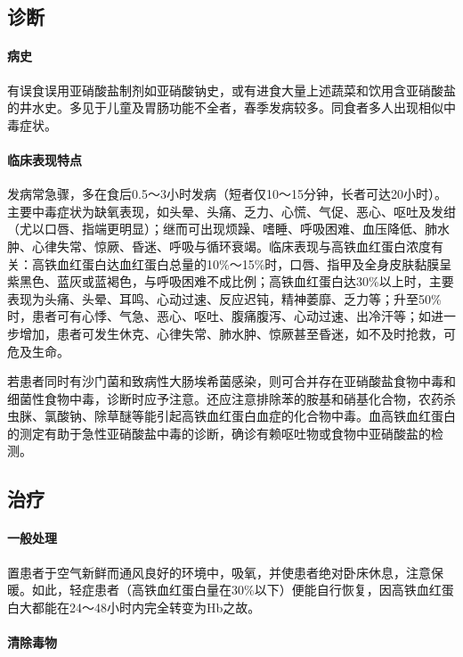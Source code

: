 \subsection{诊断}

\paragraph{病史}

有误食误用亚硝酸盐制剂如亚硝酸钠史，或有进食大量上述蔬菜和饮用含亚硝酸盐的井水史。多见于儿童及胃肠功能不全者，春季发病较多。同食者多人出现相似中毒症状。

\paragraph{临床表现特点}

发病常急骤，多在食后0.5～3小时发病（短者仅10～15分钟，长者可达20小时）。主要中毒症状为缺氧表现，如头晕、头痛、乏力、心慌、气促、恶心、呕吐及发绀（尤以口唇、指端更明显）；继而可出现烦躁、嗜睡、呼吸困难、血压降低、肺水肿、心律失常、惊厥、昏迷、呼吸与循环衰竭。临床表现与高铁血红蛋白浓度有关：高铁血红蛋白达血红蛋白总量的10\%～15\%时，口唇、指甲及全身皮肤黏膜呈紫黑色、蓝灰或蓝褐色，与呼吸困难不成比例；高铁血红蛋白达30\%以上时，主要表现为头痛、头晕、耳鸣、心动过速、反应迟钝，精神萎靡、乏力等；升至50\%时，患者可有心悸、气急、恶心、呕吐、腹痛腹泻、心动过速、出冷汗等；如进一步增加，患者可发生休克、心律失常、肺水肿、惊厥甚至昏迷，如不及时抢救，可危及生命。

若患者同时有沙门菌和致病性大肠埃希菌感染，则可合并存在亚硝酸盐食物中毒和细菌性食物中毒，诊断时应予注意。还应注意排除苯的胺基和硝基化合物，农药杀虫脒、氯酸钠、除草醚等能引起高铁血红蛋白血症的化合物中毒。血高铁血红蛋白的测定有助于急性亚硝酸盐中毒的诊断，确诊有赖呕吐物或食物中亚硝酸盐的检测。

\subsection{治疗}

\paragraph{一般处理}

置患者于空气新鲜而通风良好的环境中，吸氧，并使患者绝对卧床休息，注意保暖。如此，轻症患者（高铁血红蛋白量在30\%以下）便能自行恢复，因高铁血红蛋白大都能在24～48小时内完全转变为Hb之故。

\paragraph{清除毒物}

